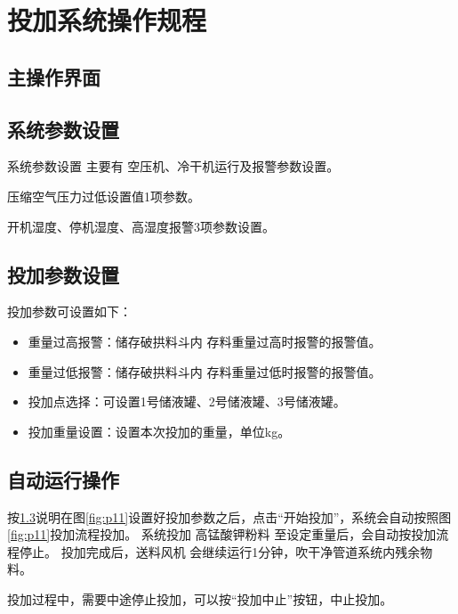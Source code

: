 \documentclass[UTF8,a4paper,12pt,titlepage]{ctexart}
\begin{document}
\section{投加系统操作规程}
   \subsection{主操作界面}
   
   \newpage

   \subsection{系统参数设置}
   系统参数设置 主要有 空压机、冷干机运行及报警参数设置。
   
    压缩空气压力过低设置值1项参数。
   
    开机湿度、停机湿度、高湿度报警3项参数设置。
   \newpage

   \subsection{投加参数设置}\label{sec:sg3}
   
   投加参数可设置如下：
   \begin{itemize}
       \item 重量过高报警：储存破拱料斗内 存料重量过高时报警的报警值。
       \item 重量过低报警：储存破拱料斗内 存料重量过低时报警的报警值。
       \item 投加点选择：可设置1号储液罐、2号储液罐、3号储液罐。
       \item 投加重量设置：设置本次投加的重量，单位kg。
   \end{itemize}

   \subsection{自动运行操作}
   按\ref{sec:sg3}说明在图\ref{fig:p11}设置好投加参数之后，点击“开始投加”，系统会自动按照图\ref{fig:p11}投加流程投加。
   系统投加 高锰酸钾粉料 至设定重量后，会自动按投加流程停止。
   投加完成后，送料风机 会继续运行1分钟，吹干净管道系统内残余物料。
   \par 投加过程中，需要中途停止投加，可以按“投加中止”按钮，中止投加。
\end{document}
